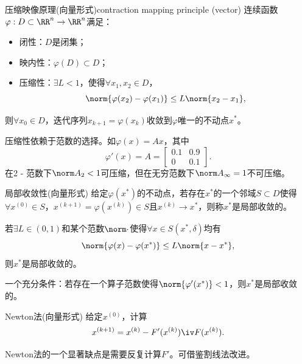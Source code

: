 \begin{theorem}
    {压缩映像原理(向量形式)}{contraction mapping principle (vector)}
    连续函数$\varphi:D\subset\RR^n\to\RR^n$满足：
    \begin{itemize}
        \item 闭性：$D$是闭集；
        \item 映内性：$\varphi(D)\subset D$；
        \item 压缩性：$\exists L<1$，使得$\forall x_1,x_2\in D$，
        \[
            \norm{\varphi(x_2)-\varphi(x_1)}\leq L\norm{x_2-x_1},
        \]
    \end{itemize}
    则$\forall x_0\in D$，迭代序列$x_{k+1}=\varphi(x_k)$收敛到$\varphi$唯一的不动点$x^*$。
\end{theorem}

\begin{remark}
    压缩性依赖于范数的选择。如$\varphi(x)=Ax$，其中
    \[
        \varphi'(x)=A=\begin{bmatrix}
            0.1&0.9\\0&0.1
        \end{bmatrix}.
    \]
    在2 - 范数下$\norm A_2<1$可压缩，但在无穷范数下$\norm A_\infty=1$不可压缩。
\end{remark}

\begin{definition}
    {局部收敛性(向量形式)}{}
    给定$\varphi(x^*)$的不动点，若存在$x^*$的一个邻域$S\subset D$使得$\forall x^{(0)}\in S$，$x^{(k+1)}=\varphi(x^{(k)})\in S$且$x^{(k)}\to x^*$，则称$x^*$是局部收敛的。
\end{definition}

\begin{theorem}
    {}{}
    若$\exists L\in(0,1)$和某个范数$\norm\cdot$使得$\forall x\in S(x^*,\delta)$均有
    \[
        \norm{\varphi(x)-\varphi(x^*)}\leq L\norm{x-x^*},
    \]
    则$x^*$是局部收敛的。
\end{theorem}

\begin{corollary}
    一个充分条件：若存在一个算子范数使得$\norm{\varphi'(x^*)}<1$，则$x^*$是局部收敛的。
\end{corollary}

\begin{theorem}
    {Newton法(向量形式)}{}
    给定$x^{(0)}$，计算 
    \[
        x^{(k+1)}=x^{(k)}-F'(x^{(k)})\iv F(x^{(k)}).
    \]
\end{theorem}

\begin{remark}
    Newton法的一个显著缺点是需要反复计算$F'$。可借鉴割线法改进。
\end{remark}

